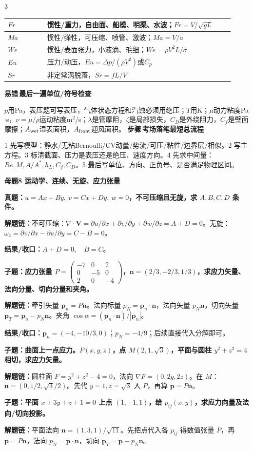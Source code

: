 \documentclass[a4paper]{article}
\newcommand{\mt}[1]{\vspace{0.45pt}\colorbox{M}{\parbox{\dimexpr\linewidth-2\fboxsep}{\color{white}\bfseries #1}}\par}
\newcommand{\qt}[1]{\vspace{0.25pt}\colorbox{Q}{\parbox{\dimexpr\linewidth-2\fboxsep}{\color{white}\bfseries #1}}\par}
\newcommand{\chain}[1]{{\color{A}\bfseries 解题链：}#1\par}
\newcommand{\res}[1]{{\color{E}\bfseries 结果/收口：}#1\par}
\newcommand{\labtag}[3]{{\bfseries\color{#1}\colorbox{#1}{\color{white}\fontsize{2.35}{2.48}\selectfont #2}\,#3}\par}
\newcommand{\step}[1]{\labtag{S}{步骤}{#1}}
\newcommand{\err}[1]{\labtag{R}{易错}{#1}}
\newcommand{\stepq}[1]{\step{#1}}
\newcommand{\errq}[1]{\err{#1}}
\newenvironment{vfourWrap}{\par\begingroup\fontsize{2.68}{2.84}\selectfont\setlength{\fboxsep}{0.45pt}}{\par\endgroup}
\begin{document}
\begin{multicols}{3}
\begin{vfourWrap}
\begin{tabular}{|p{0.16\linewidth}|p{0.76\linewidth}|}
$Fr$ & 惯性/重力，自由面、船模、明渠、水波；$Fr=V/\sqrt{gL}$\\ \hline
$Ma$ & 惯性/弹性，可压缩、喷管、激波；$Ma=V/a$\\ \hline
$We$ & 惯性/表面张力，小液滴、毛细；$We=\rho V^2L/\sigma$\\ \hline
$Eu$ & 压力/动压，$Eu=\Delta p/(\rho V^2)$或$C_p$\\ \hline
$Sr$ & 非定常涡脱落，$Sr=fL/V$\\ \hline
\end{tabular}
\errq{最后一遍单位/符号检查}
$p$用Pa，表压题可写表压，气体状态方程和汽蚀必须用绝压；$T$用K；$\mu$动力粘度Pa$\cdot$s，$\nu=\mu/\rho$运动粘度m$^2$/s；$\lambda$是管摩阻，$\zeta$是局部损失，$C_D$是外绕阻力，$C_f$是壁面摩擦；$A_{\rm wet}$湿表面积，$A_{\rm front}$迎风面积。
\stepq{考场落笔最短总流程}
1 先写模型：静水/无粘Bernoulli/CV动量/势流/可压/粘性/边界层/相似。2 写主方程。3 标清截面、压力是表压还是绝压、速度方向。4 先求中间量：$Re,M,A/A^*,h_L,C_f,C_D$。5 最后写单位、方向、正负号、是否满足物理区间。
\end{vfourWrap}
\mt{母题8 运动学、连续、无旋、应力张量}
\qt{真题：$u=Ax+By,\ v=Cx+Dy,\ w=0$，不可压缩且无旋，求 $A,B,C,D$ 条件。}
\chain{不可压缩：$\nabla\cdot\bm V=\partial u/\partial x+\partial v/\partial y+\partial w/\partial z=A+D=0$。无旋：$\omega_z=\partial v/\partial x-\partial u/\partial y=C-B=0$。}
\res{$A+D=0,\quad B=C$。}

\qt{子题：应力张量 $P=\begin{pmatrix}-7&0&2\\0&-5&0\\2&0&-4\end{pmatrix}$，$\bm n=(2/3,-2/3,1/3)$，求应力矢量、法向分量、切向分量和夹角。}
\chain{牵引矢量 $\bm p_n=P\bm n$。法向标量 $p_N=\bm p_n\cdot\bm n$，法向矢量 $p_N\bm n$，切向矢量 $\bm p_T=\bm p_n-p_N\bm n$。夹角 $\cos\alpha=(\bm p_n\cdot\bm n)/|\bm p_n|$。}
\res{$\bm p_n=(-4,-10/3,0)$；$p_N=-4/9$；后续直接代入分解即可。}

\qt{子题：曲面上一点应力。$P(x,y,z)$，点 $M(2,1,\sqrt3)$，平面与圆柱 $y^2+z^2=4$ 相切，求应力矢量。}
\chain{圆柱面 $F=y^2+z^2-4=0$，法向 $\nabla F=(0,2y,2z)$。在 $M$：$\bm n=(0,1/2,\sqrt3/2)$。先代 $y=1,z=\sqrt3$ 入 $P$，再算 $\bm p=P\bm n$。}

\qt{子题：平面 $x+3y+z+1=0$ 上点 $(1,-1,1)$，给 $p_{ij}(x,y)$，求应力向量及法向/切向投影。}
\chain{平面法向 $\bm n=(1,3,1)/\sqrt{11}$。先把点代入各 $p_{ij}$ 得数值张量 $P$，再 $\bm p=P\bm n$，法向 $p_N=\bm p\cdot\bm n$，切向 $\bm p_T=\bm p-p_N\bm n$。}


\end{multicols}
\end{document}
